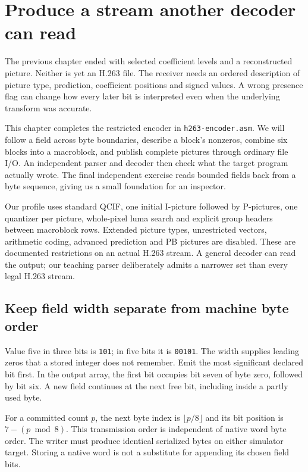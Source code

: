 \chapter{Produce a stream another decoder can read}
\label{revision:producing-video-streams}

The previous chapter ended with selected coefficient levels and a reconstructed
picture. Neither is yet an H.263 file. The receiver needs an ordered description
of picture type, prediction, coefficient positions and signed values. A wrong
presence flag can change how every later bit is interpreted even when the
underlying transform was accurate.

This chapter completes the restricted encoder in \texttt{h263-encoder.asm}.
We will follow a field across byte boundaries, describe a block's nonzeros,
combine six blocks into a macroblock, and publish complete pictures through
ordinary file I/O. An independent parser and decoder then check what the target
program actually wrote. The final independent exercise reads bounded fields
back from a byte sequence, giving us a small foundation for an inspector.

Our profile uses standard QCIF, one initial I-picture followed by P-pictures,
one quantizer per picture, whole-pixel luma search and explicit group headers
between macroblock rows. Extended picture types, unrestricted vectors, arithmetic
coding, advanced prediction and PB pictures are disabled. These are documented
restrictions on an actual H.263 stream. A general decoder can read the output;
our teaching parser deliberately admits a narrower set than every legal H.263
stream.

\section{Keep field width separate from machine byte order}

Value five in three bits is \texttt{101}; in five bits it is \texttt{00101}.
The width supplies leading zeros that a stored integer does not remember.
Emit the most significant declared bit first. In the output array, the first
bit occupies bit seven of byte zero, followed by bit six. A new field continues
at the next free bit, including inside a partly used byte.

For a committed count $p$, the next byte index is $\lfloor p/8\rfloor$ and its
bit position is $7-(p\bmod8)$. This transmission order is independent of native
word byte order. The writer must produce identical serialized bytes on either
simulator target. Storing a native word is not a substitute for appending its
chosen field bits.

